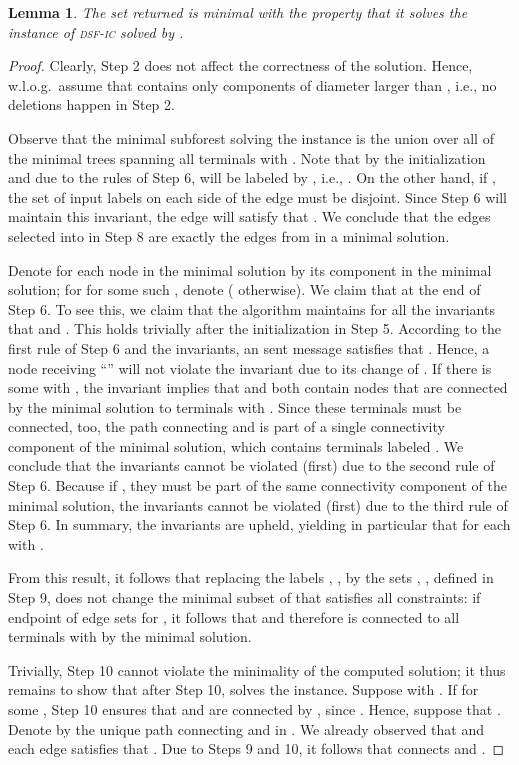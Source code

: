 \documentclass[letterpaper,11pt]{article}
\newtheorem{lemma}[theorem]{Lemma}
\newcommand{\sfic}{\textsc{dsf-ic}\xspace}
\begin{document}
\begin{lemma}\label{lemma:prune_correct}
The set  returned is minimal with the property that it solves
the instance of \sfic solved by .
\end{lemma}
\begin{proof}
Clearly, Step 2 does not affect the correctness of the solution. Hence,
w.l.o.g.\ assume that  contains only components of diameter larger than
, i.e., no deletions happen in Step 2.

Observe that the minimal subforest solving the instance is the union over all
 of the minimal trees  spanning all
terminals  with . Note that by the initialization and
due to the rules of Step 6,  will be labeled by
, i.e., . On the other hand, if , the set of input labels on each side of the edge must be
disjoint. Since Step 6 will maintain this invariant, the edge will satisfy that
. We conclude that the edges selected into  in Step 8 are
exactly the edges from  in a minimal solution.

Denote for each node  in the minimal solution by  its
component in the minimal solution; for  for some such , denote
 ( otherwise). We claim that  at the end of Step 6. To see
this, we claim that the algorithm maintains for all  the invariants that
 and
. This
holds trivially after the initialization in Step 5. According to the first rule
of Step 6 and the invariants, an sent message  satisfies that . Hence, a
node  receiving ``'' will not violate the invariant due to its
change of . If there is some  with ,
the invariant implies that  and  both contain nodes that are connected by
the minimal solution to terminals  with .
Since these terminals must be connected, too, the path connecting  and 
is part of a single connectivity component of the minimal solution, which
contains terminals labeled . We conclude that the invariants cannot be
violated (first) due to the second rule of Step 6. Because if , they must be part of the same connectivity component
of the minimal solution, the invariants cannot be violated (first) due to the
third rule of Step 6. In summary, the invariants are upheld, yielding in
particular that  for each  with .

From this result, it follows that replacing the labels , , by
the sets , , defined in Step 9, does not change the minimal subset
of  that satisfies all constraints: if endpoint  of edge  sets  for , it follows
that  and therefore  is connected to all terminals
 with  by the minimal solution.

Trivially, Step 10 cannot violate the minimality of the computed solution; it
thus remains to show that after Step 10,  solves the instance. Suppose
 with . If  for some , Step 10 ensures
that  and  are connected by , since . Hence,
suppose that . Denote by  the unique path connecting
 and  in . We already observed that 
and each edge  satisfies that . Due to
Steps 9 and 10, it follows that  connects  and .
\end{proof}
\end{document}
